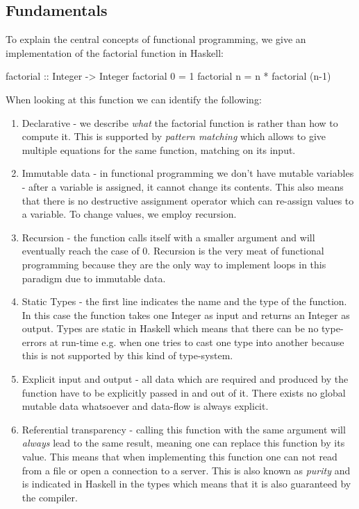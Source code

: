 \subsection{Fundamentals}

To explain the central concepts of functional programming, we give an implementation of the factorial function in Haskell:
\begin{HaskellCode}
factorial :: Integer -> Integer
factorial 0 = 1
factorial n = n * factorial (n-1)
\end{HaskellCode}

When looking at this function we can identify the following: 
\begin{enumerate}
	\item Declarative - we describe \textit{what} the factorial function is rather than how to compute it. This is supported by \textit{pattern matching} which allows to give multiple equations for the same function, matching on its input. 
	\item Immutable data - in functional programming we don't have mutable variables - after a variable is assigned, it cannot change its contents. This also means that there is no destructive assignment operator which can re-assign values to a variable. To change values, we employ recursion.
	\item Recursion - the function calls itself with a smaller argument and will eventually reach the case of 0. Recursion is the very meat of functional programming because they are the only way to implement loops in this paradigm due to immutable data.
	\item Static Types - the first line indicates the name and the type of the function. In this case the function takes one Integer as input and returns an Integer as output. Types are static in Haskell which means that there can be no type-errors at run-time e.g. when one tries to cast one type into another because this is not supported by this kind of type-system.
	\item Explicit input and output - all data which are required and produced by the function have to be explicitly passed in and out of it. There exists no global mutable data whatsoever and data-flow is always explicit.
	\item Referential transparency - calling this function with the same argument will \textit{always} lead to the same result, meaning one can replace this function by its value. This means that when implementing this function one can not read from a file or open a connection to a server. This is also known as \textit{purity} and is indicated in Haskell in the types which means that it is also guaranteed by the compiler.
\end{enumerate}

